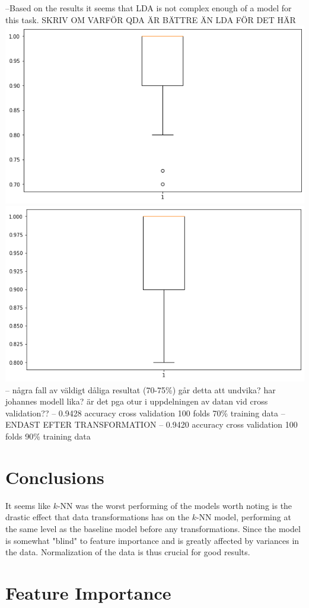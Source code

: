 \documentclass{article}
\begin{document}
--Based on the results it seems that LDA is not complex enough of a model for this task. SKRIV OM VARFÖR QDA ÄR BÄTTRE ÄN LDA FÖR DET HÄR
\includegraphics[scale=0.3]{project/tex/boxplotQDA.png}
\includegraphics[scale=0.3]{project/tex/boxplotQDA90.png}
-- några fall av väldigt dåliga resultat (70-75\%) går detta att undvika? har johannes modell lika? är det pga otur i uppdelningen av datan vid cross validation??
-- 0.9428 accuracy cross validation 100 folds 70\% training data
-- ENDAST EFTER TRANSFORMATION
-- 0.9420 accuracy cross validation 100 folds 90\% training data

\section{Conclusions}
It seems like $k$-NN was the worst performing of the models worth noting is the drastic effect that data transformations has on the $k$-NN model, performing at the same level as the baseline model before any transformations. Since the model is somewhat "blind" to feature importance and is greatly affected by variances in the data. Normalization of the data is thus crucial for good results.



\section{Feature Importance}
\end{document}
